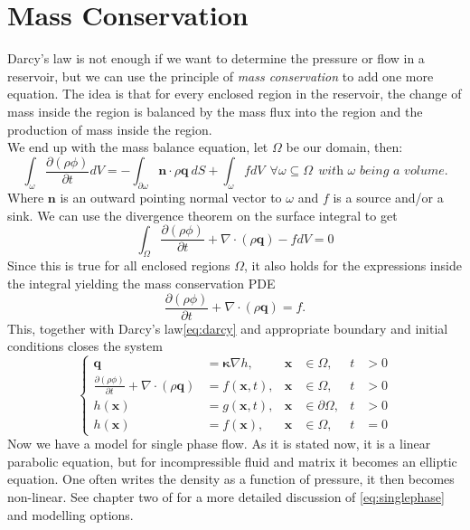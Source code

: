 \documentclass[../Main/main.tex]{subfiles}
\begin{document}
\section*{Mass Conservation}
Darcy's law is not enough if we want to determine the pressure or flow in a reservoir, but we can use the principle of \emph{mass conservation} to add one more equation. 
The idea is that for every enclosed region in the reservoir, the change of mass inside the region is balanced by the mass flux into the region and the production of mass inside the region.
\\
We end up with the mass balance equation, let $\Omega$ be our domain, then:
\begin{equation*}
\int_{\omega}\frac{\partial (\rho \phi) }{\partial t} dV= -\int_{\partial\omega}\bm{n}\cdot\rho\bm{q} \ dS+\int_{\omega} f dV \ \ \forall \omega \subseteq \Omega \ \ \textit{with }\omega \textit{ being a volume.}
\end{equation*}
Where $\bm{n}$ is an outward pointing normal vector to $\omega$ and $f$ is a source and/or a sink. We can use the divergence theorem on the surface integral to get
\begin{equation*}
\int_{\Omega}\frac{\partial (\rho \phi) }{\partial t} + \nabla \cdot(\rho \bm{q}) -fdV= 0
\end{equation*}
Since this is true for all enclosed regions $\Omega$, it also holds for the expressions inside the integral yielding the mass conservation PDE
\begin{equation*}
\frac{\partial (\rho \phi) }{\partial t} + \nabla \cdot (\rho \bm{q}) = f.
\end{equation*}
This, together with Darcy's law\eqref{eq:darcy} and appropriate boundary and initial conditions closes the system
\begin{equation}\label{eq:singlephase}
\left \{ \begin{aligned}
	\bm{q} &=\bm{\kappa} \nabla h, & \bm{x} &\in \Omega,  &t &>0 \\
	\frac{\partial (\rho \phi) }{\partial t} + \nabla \cdot(\rho \bm{q}) &=f(\bm{x},t), & \bm{x} &\in \Omega, & t &>0 \\
	h(\bm{x}) &= g(\bm{x},t), &\bm{x} &\in \partial \Omega,&t &>0 \\
	h(\bm{x}) &= f(\bm{x}), & 	\bm{x} &\in \Omega,  &	t &=0 
\end{aligned}\right. 
\end{equation}
Now we have a model for single phase flow. As it is stated now, it is a linear parabolic equation, but for incompressible fluid and matrix it becomes an elliptic equation. One often writes the density as a function of pressure, it then becomes non-linear. See chapter two of \cite{Nordbotten} for a more detailed discussion of \eqref{eq:singlephase} and modelling options.
\end{document}
